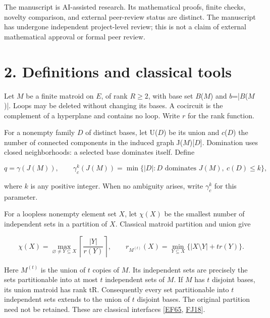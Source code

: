 \documentclass[11pt]{article}
\begin{document}
The manuscript is AI-assisted research. Its mathematical proofs, finite checks, novelty comparison, and external peer-review status are distinct. The manuscript has undergone independent project-level review; this is not a claim of external mathematical approval or formal peer review.

\section*{2. Definitions and classical tools}

Let \(M\) be a finite matroid on \(E\), of rank \(R\ge2\), with base set \(B\)(\(M\)) and \(b\)=|\(B\)(\(M\))|. Loops may be deleted without changing its bases. A cocircuit is the complement of a hyperplane and contains no loop. Write \(r\) for the rank function.

For a nonempty family \(D\) of distinct bases, let U(\(D\)) be its union and \(c\)(\(D\)) the number of connected components in the induced graph J(\(M\))[\(D\)]. Domination uses closed neighborhoods: a selected base dominates itself. Define

\[
q=\gamma(J(M)),\qquad
\gamma_c^k(J(M))=\min\{|D|:D\text{ dominates }J(M),\ c(D)\le k\},
\]

where \(k\) is any positive integer. When no ambiguity arises, write \(\gamma_c^k\) for this parameter.

For a loopless nonempty element set \(X\), let \(\chi(X)\) be the smallest number of independent sets in a partition of \(X\). Classical matroid partition and union give

\[
\chi(X)=\max_{\varnothing\ne Y\subseteq X}
\left\lceil\frac{|Y|}{r(Y)}\right\rceil,
\qquad
r_{M^{(t)}}(X)=\min_{Y\subseteq X}\{|X\setminus Y|+t r(Y)\}.
\]

Here \(M^{(t)}\) is the union of \(t\) copies of \(M\). Its independent sets are precisely the sets partitionable into at most \(t\) independent sets of \(M\). If \(M\) has \(t\) disjoint bases, its union matroid has rank tR. Consequently every set partitionable into \(t\) independent sets extends to the union of \(t\) disjoint bases. The original partition need not be retained. These are classical interfaces [\hyperlink{refEF65}{EF65}, \hyperlink{refFJ18}{FJ18}].
\end{document}
